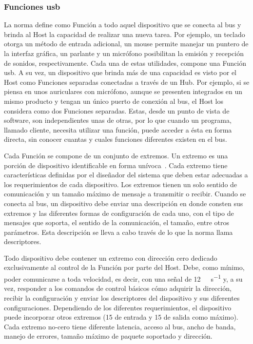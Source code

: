 \subsubsection{Funciones \acrshort{usb}}
	La norma define como Función a todo aquel dispositivo que se conecta al bus y brinda al Host la capacidad de realizar una nueva tarea. Por ejemplo, un teclado otorga un método de entrada adicional, un mouse permite manejar un puntero de la interfaz gráfica, un parlante y un micrófono posibilitan la emisión y recepción de sonidos, respectivamente. Cada una de estas utilidades, compone una Función \acrshort{usb}. A su vez, un dispositivo que brinda más de una capacidad es visto por el Host como Funciones separadas conectadas a través de un Hub. Por ejemplo, si se piensa en unos auriculares con micrófono, aunque se presenten integrados en un mismo producto y tengan un único puerto de conexión al bus, el Host los considera como dos Funciones separadas. Estas, desde un punto de vista de software, son independientes unas de otras, por lo que cuando un programa, llamado cliente, necesita utilizar una función, puede acceder a ésta en forma directa, sin conocer cuantas y cuales funciones diferentes existen en el bus.%
	
	Cada Función se compone de un conjunto de extremos. Un extremo es una porción de dispositivo identificable en forma unívoca~\cite{USBspec}. Cada extremo tiene características definidas por el diseñador del sistema que deben estar adecuadas a los requerimientos de cada dispositivo. Los extremos tienen un solo sentido de comunicación y un tamaño máximo de mensaje a transmitir o recibir. Cuando se conecta al bus, un dispositivo debe enviar una descripción en donde consten sus extremos y las diferentes formas de configuración de cada uno, con el tipo de mensajes que soporta, el sentido de la comunicación, el tamaño, entre otros parámetros. Esta descripción se lleva a cabo través de lo que la norma llama descriptores.%
	
	Todo dispositivo debe contener un extremo con dirección cero dedicado exclusivamente al control de la Función por parte del Host. Debe, como mínimo, poder comunicarse a toda velocidad, es decir, con una señal de \SI{12}{\mega\bit\per\second} y, a su vez, responder a los comandos de control básicos cómo adquirir la dirección, recibir la configuración y enviar los descriptores del dispositivo y sus diferentes configuraciones. Dependiendo de los diferentes requerimientos, el dispositivo puede incorporar otros extremos (15 de entrada y 15 de salida como máximo). Cada extremo no-cero tiene diferente latencia, acceso al bus, ancho de banda, manejo de errores, tamaño máximo de paquete soportado y dirección.
	
